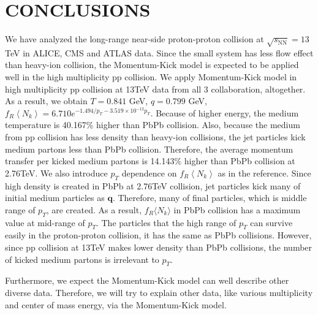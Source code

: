 \documentclass[jkps,fleqn,showpacs,showkeys]{revtex4}
\begin{document}
\section*{CONCLUSIONS}
\label{sec:Conclusion}


We have analyzed the long-range near-side proton-proton collision at $\sqrt{s_\text{NN}}=13$TeV in ALICE, CMS and ATLAS data. 
Since the small system has less flow effect than heavy-ion collision, the Momentum-Kick model is expected to be applied well in the high multiplicity pp collision.
We apply Momentum-Kick model in high multiplicity pp collision at 13TeV data from all 3 collaboration, altogether. 
As a result, we obtain $T=0.841$ GeV, $q=0.799$ GeV, $f_R\left\langle N_k\right\rangle = 6.710e^{-1.494/p_T-3.519\times10^{-12}p_T}$.
Because of higher energy, the medium temperature is 40.167\% higher than PbPb collision.
Also, because the medium from pp collision has less density than heavy-ion collisions, the jet particles kick medium partons less than PbPb collision.
Therefore, the average momentum transfer per kicked medium partons is 14.143\% higher than PbPb collision at 2.76TeV.
We also introduce $p_T$ dependence on $f_R\left\langle N_k\right\rangle$ as in the reference\cite{PbPb}.
Since high density is created in PbPb at 2.76TeV collision, jet particles kick many of initial medium particles as $\textbf{q}$.
Therefore, many of final particles, which is middle range of $p_T$, are created.
As a result, $f_R \langle N_k \rangle$ in PbPb collision has a maximum value at mid-range of $p_T$.
The particles that the high range of $p_T$ can survive easily in the proton-proton collision, it has the same as PbPb collisions.
However, since pp collision at 13TeV makes lower density than PbPb collisions, the number of kicked medium partons is irrelevant to $p_T$.

Furthermore, we expect the Momentum-Kick model can well describe other diverse data.
Therefore, we will try to explain other data, like various multiplicity and center of mass energy, via the Momentum-Kick model.

\end{document}
